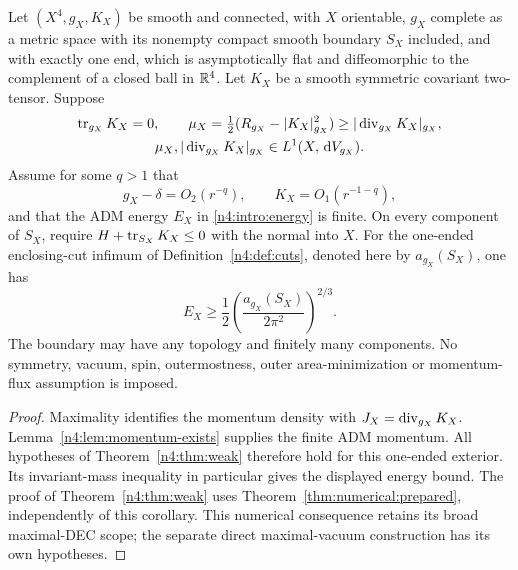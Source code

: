 \begin{corollary}
\label{n4:cor:maximal-dec}\label{n4:ass:energy}
Let $(X^4,g_X,K_X)$ be smooth and connected, with $X$ orientable,
$g_X$ complete as a metric space with its nonempty compact smooth
boundary $S_X$ included, and with exactly one end, which is asymptotically
flat and diffeomorphic to the complement of a closed ball in $\mathbb R^4$.
Let $K_X$ be a smooth symmetric covariant two-tensor. Suppose
\[
\begin{gathered}
 \operatorname{tr}_{g_X}K_X=0,\qquad
 \mu_X=\tfrac12(R_{g_X}-|K_X|_{g_X}^2)
       \ge|\operatorname{div}_{g_X}K_X|_{g_X},\\
 \mu_X,|\operatorname{div}_{g_X}K_X|_{g_X}\in L^1(X,\,\mathrm d V_{g_X}).
\end{gathered}
\]
Assume for some $q>1$ that
\[
 g_X-\delta=O_2(r^{-q}),\qquad K_X=O_1(r^{-1-q}),
\]
and that the ADM energy $E_X$ in \eqref{n4:intro:energy} is finite.
On every component of $S_X$, require
$H+\operatorname{tr}_{S_X}K_X\le0$ with the normal into $X$.
For the one-ended enclosing-cut infimum of Definition~\ref{n4:def:cuts},
denoted here by $a_{g_X}(S_X)$, one has
\[
 E_X\ge\frac12\left(\frac{a_{g_X}(S_X)}{2\pi^2}\right)^{2/3}.
\]
The boundary may have any topology and finitely many components.
No symmetry, vacuum, spin, outermostness, outer area-minimization
or momentum-flux assumption is imposed.
\end{corollary}

\begin{proof}
Maximality identifies the momentum density with
$J_X=\operatorname{div}_{g_X}K_X$. Lemma~\ref{n4:lem:momentum-exists} supplies
the finite ADM momentum. All hypotheses of
Theorem~\ref{n4:thm:weak} therefore hold for this one-ended exterior.
Its invariant-mass inequality in particular gives the displayed
energy bound. The proof of Theorem~\ref{n4:thm:weak} uses
Theorem~\ref{thm:numerical:prepared}, independently of this corollary.
This numerical consequence retains its broad maximal-DEC scope; the
separate direct maximal-vacuum construction has its own hypotheses.
\end{proof}

